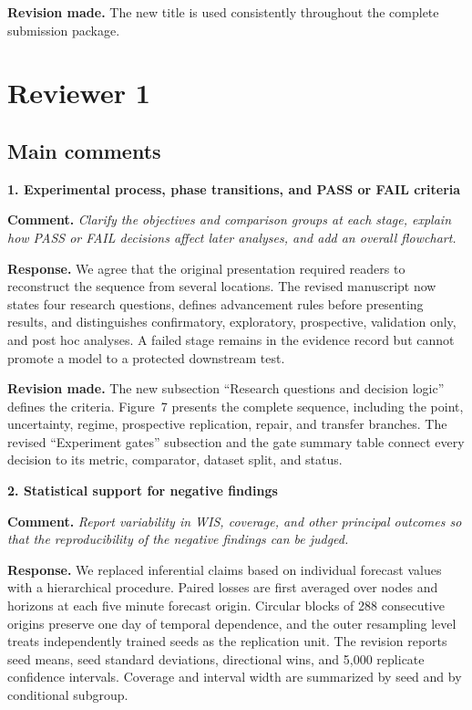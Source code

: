 \documentclass[11pt]{article}
\newcommand{\comment}[1]{\textbf{Comment.} \emph{#1}}
\newcommand{\response}[1]{\textbf{Response.} #1}
\newcommand{\change}[1]{\textbf{Revision made.} #1}
\begin{document}
\change{The new title is used consistently throughout the complete submission package.}

\section*{Reviewer 1}

\subsection*{Main comments}

\textbf{1. Experimental process, phase transitions, and PASS or FAIL criteria}

\comment{Clarify the objectives and comparison groups at each stage, explain how PASS or FAIL decisions affect later analyses, and add an overall flowchart.}

\response{We agree that the original presentation required readers to reconstruct the sequence from several locations. The revised manuscript now states four research questions, defines advancement rules before presenting results, and distinguishes confirmatory, exploratory, prospective, validation only, and post hoc analyses. A failed stage remains in the evidence record but cannot promote a model to a protected downstream test.}

\change{The new subsection ``Research questions and decision logic'' defines the criteria. Figure~7 presents the complete sequence, including the point, uncertainty, regime, prospective replication, repair, and transfer branches. The revised ``Experiment gates'' subsection and the gate summary table connect every decision to its metric, comparator, dataset split, and status.}

\textbf{2. Statistical support for negative findings}

\comment{Report variability in WIS, coverage, and other principal outcomes so that the reproducibility of the negative findings can be judged.}

\response{We replaced inferential claims based on individual forecast values with a hierarchical procedure. Paired losses are first averaged over nodes and horizons at each five minute forecast origin. Circular blocks of 288 consecutive origins preserve one day of temporal dependence, and the outer resampling level treats independently trained seeds as the replication unit. The revision reports seed means, seed standard deviations, directional wins, and 5,000 replicate confidence intervals. Coverage and interval width are summarized by seed and by conditional subgroup.}
\end{document}
